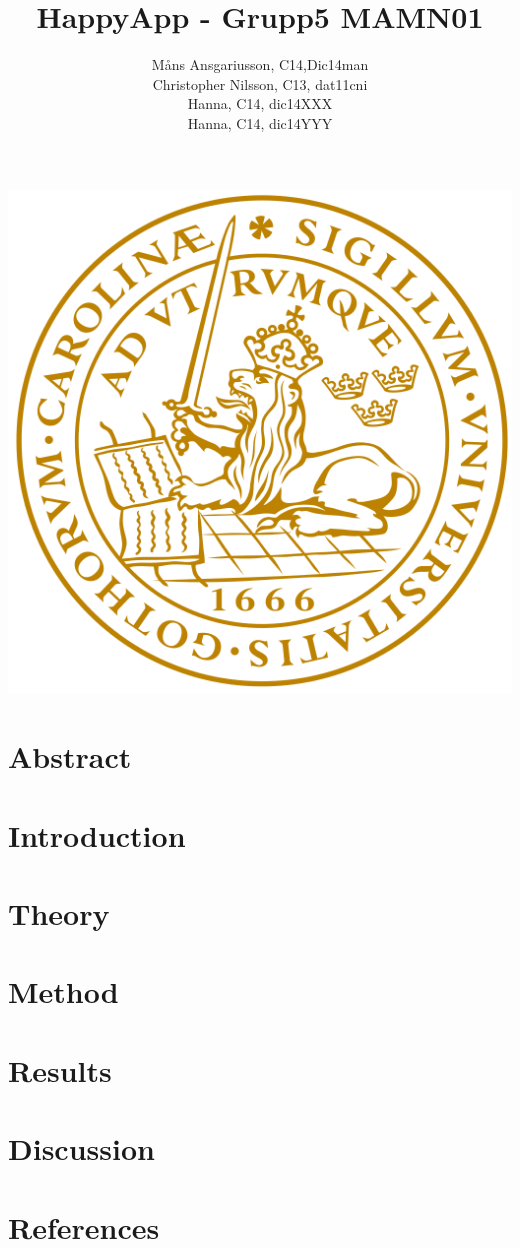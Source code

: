 \documentclass{article}
\begin{document}
\title{HappyApp - Grupp5 MAMN01}
\author{Måns Ansgariusson, C14,Dic14man\\ Christopher Nilsson, C13, dat11cni \\ Hanna, C14, dic14XXX \\ Hanna, C14, dic14YYY }
\maketitle
\centerline{\includegraphics[width=\textwidth]{LTH.png}}
\newpage
\tableofcontents
\newpage
\section{Abstract}
\label{sec:abstract}
\section{Introduction}
\label{sec:indtroduction}
\section{Theory}
\label{sec:theory}
\section{Method}
\label{sec:method}
\section{Results}
\label{sec:results}
\section{Discussion}
\label{sec:discussion}
\section{References}
\label{sec:references}
\end{document}
